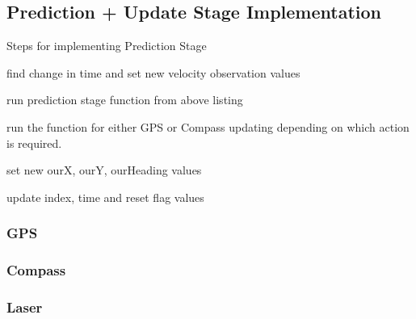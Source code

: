 	\subsection{Prediction + Update Stage Implementation}
	Steps for implementing Prediction Stage 
	\begin{list}{)~}{}
		\item find change in time and set new velocity observation values
		\item run prediction stage function from above listing
		\item run the function for either GPS or Compass updating depending on which action is required.
		\item set new ourX, ourY, ourHeading values
		\item update index, time and  reset flag values

	\end{list}
		\subsubsection{GPS}
			
		\subsubsection{Compass}
			
		\pagebreak
		\subsubsection{Laser}
			

	\pagebreak
